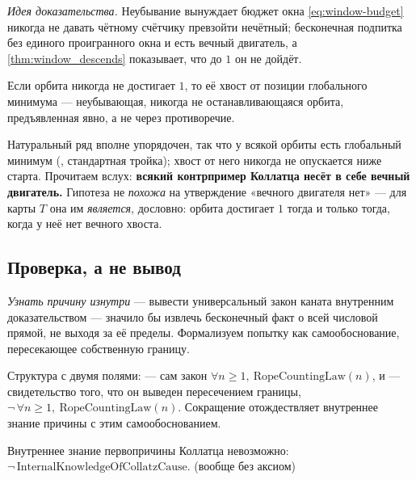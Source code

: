 \emph{Идея доказательства.} Неубывание вынуждает бюджет окна \cref{eq:window-budget} никогда не давать
чётному счётчику превзойти нечётный; бесконечная подпитка без единого проигранного окна и есть вечный
двигатель, а \cref{thm:window_descends} показывает, что до $1$ он не дойдёт.

\begin{theorem}\label{thm:nonHalting_carries_perpetual_engine}
Если орбита никогда не достигает $1$, то её хвост от позиции глобального минимума --- неубывающая,
никогда не останавливающаяся орбита, предъявленная явно, а не через противоречие. \green{}
\end{theorem}

Натуральный ряд вполне упорядочен, так что у всякой орбиты есть глобальный минимум
(, стандартная тройка); хвост от него никогда не опускается ниже старта.
Прочитаем вслух: \textbf{всякий контрпример Коллатца несёт в себе вечный двигатель.} Гипотеза не
\emph{похожа} на утверждение «вечного двигателя нет» --- для карты $T$ она им \emph{является}, дословно:
орбита достигает $1$ тогда и только тогда, когда у неё нет вечного хвоста.

\subsection{Проверка, а не вывод}

\emph{Узнать причину изнутри} --- вывести универсальный закон каната внутренним доказательством ---
значило бы извлечь бесконечный факт о всей числовой прямой, не выходя за её пределы. Формализуем
попытку как самообоснование, пересекающее собственную границу.

\begin{definition}\label{def:internalisedCollatzGround}
Структура с двумя полями:  --- сам закон $\forall n\ge 1,\ \mathrm{RopeCountingLaw}(n)$, и
 --- свидетельство того, что он выведен пересечением границы,
$\neg\,\forall n\ge 1,\ \mathrm{RopeCountingLaw}(n)$. Сокращение
 отождествляет внутреннее знание причины с этим самообоснованием.
\end{definition}

\begin{theorem}\label{thm:collatzCause_unknowable}
Внутреннее знание первопричины Коллатца невозможно:
$\neg\,\mathrm{InternalKnowledgeOfCollatzCause}$. \green{} (вообще без аксиом)
\end{theorem}

